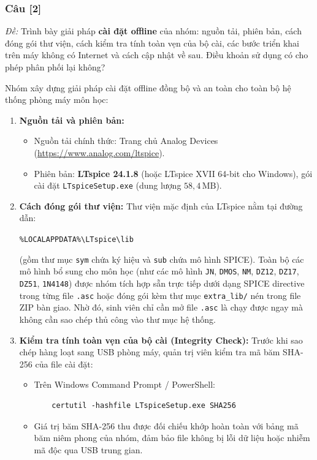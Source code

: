 \documentclass[12pt,a4paper]{article}
\newcommand{\cauhoi}[2]{%
  \subsubsection{Câu [#1]}
  \begin{tcolorbox}[colback=white,colframe=guidegray!70,boxrule=0.4pt,arc=1pt,left=5pt,right=5pt,top=2pt,bottom=2pt]
  \small\textit{Đề:} #2
  \end{tcolorbox}
  \par\vspace{4pt}}
\begin{document}
\cauhoi{2}{Trình bày giải pháp \textbf{cài đặt offline} của nhóm: nguồn tải, phiên bản, cách đóng gói thư viện, cách kiểm tra tính toàn vẹn của bộ cài, các bước triển khai trên máy không có Internet và cách cập nhật về sau. Điều khoản sử dụng có cho phép phân phối lại không?}

Nhóm xây dựng giải pháp cài đặt offline đồng bộ và an toàn cho toàn bộ hệ thống phòng máy môn học:

\begin{enumerate}
  \item \textbf{Nguồn tải và phiên bản:}
  \begin{itemize}
    \item Nguồn tải chính thức: Trang chủ Analog Devices (\url{https://www.analog.com/ltspice}).
    \item Phiên bản: \textbf{LTspice 24.1.8} (hoặc LTspice XVII 64-bit cho Windows), gói cài đặt \texttt{LTspiceSetup.exe} (dung lượng $58{,}4\,\text{MB}$).
  \end{itemize}

  \item \textbf{Cách đóng gói thư viện:}
  Thư viện mặc định của LTspice nằm tại đường dẫn:
  \begin{center}\small
  \texttt{\%LOCALAPPDATA\%\textbackslash LTspice\textbackslash lib}
  \end{center}
  (gồm thư mục \texttt{sym} chứa ký hiệu và \texttt{sub} chứa mô hình SPICE). Toàn bộ các mô hình bổ sung cho môn học (như các mô hình \texttt{JN}, \texttt{DMOS}, \texttt{NM}, \texttt{DZ12}, \texttt{DZ17}, \texttt{DZ51}, \texttt{1N4148}) được nhóm tích hợp sẵn trực tiếp dưới dạng SPICE directive trong từng file \texttt{.asc} hoặc đóng gói kèm thư mục \texttt{extra\_lib/} nén trong file ZIP bàn giao. Nhờ đó, sinh viên chỉ cần mở file \texttt{.asc} là chạy được ngay mà không cần sao chép thủ công vào thư mục hệ thống.

  \item \textbf{Kiểm tra tính toàn vẹn của bộ cài (Integrity Check):}
  Trước khi sao chép hàng loạt sang USB phòng máy, quản trị viên kiểm tra mã băm SHA-256 của file cài đặt:
  \begin{itemize}
    \item Trên Windows Command Prompt / PowerShell:
    \begin{verbatim}
    certutil -hashfile LTspiceSetup.exe SHA256
    \end{verbatim}
    \item Giá trị băm SHA-256 thu được đối chiếu khớp hoàn toàn với bảng mã băm niêm phong của nhóm, đảm bảo file không bị lỗi dữ liệu hoặc nhiễm mã độc qua USB trung gian.
  \end{itemize}


\end{enumerate}
\end{document}
